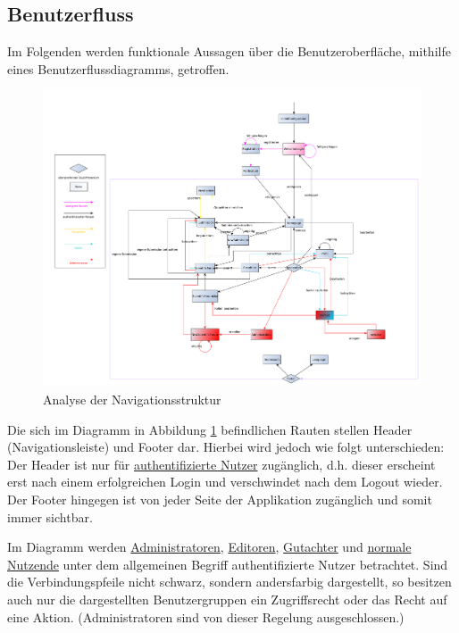 \usepackage{hyperref}
\subsection{Benutzerfluss}
Im Folgenden werden funktionale Aussagen über die Benutzeroberfläche, mithilfe eines Benutzerflussdiagramms, getroffen.

\begin{figure}[H]
	\centering
	\includegraphics[width=\linewidth]{graphics/benutzerFlussyEd}
	\caption{Analyse der Navigationsstruktur}
	\label{fig:benutzerfluss}
\end{figure}

Die sich im Diagramm in Abbildung \ref{fig:benutzerfluss} befindlichen Rauten stellen Header (Navigationsleiste) und Footer dar.
Hierbei wird jedoch wie folgt unterschieden: Der Header ist nur für \hyperref[mkrit:angemeldet]{authentifizierte Nutzer} zugänglich,
d.h. dieser erscheint erst nach einem erfolgreichen Login und verschwindet nach dem Logout wieder.
Der Footer hingegen ist von jeder Seite der Applikation zugänglich und somit immer sichtbar.

Im Diagramm werden \hyperref[mkrit:admin]{Administratoren}, \hyperref[mkrit:editor]{Editoren}, \hyperref[mkrit:gutachter]{Gutachter} und \hyperref[mkrit:angemeldet]{normale Nutzende} unter dem allgemeinen Begriff
authentifizierte Nutzer betrachtet.
Sind die Verbindungspfeile nicht schwarz, sondern andersfarbig dargestellt, so besitzen auch nur die
dargestellten Benutzergruppen ein Zugriffsrecht oder das Recht auf eine Aktion. (Administratoren sind von dieser Regelung
ausgeschlossen.)

